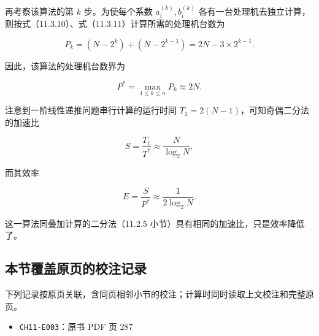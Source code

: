 \documentclass[
  10pt,
  fontset=fandol]{ctexart}
\providecommand{\tightlist}{%
  \setlength{\itemsep}{0pt}\setlength{\parskip}{0pt}}
\begin{document}
再考察该算法的第 \(k\) 步。为使每个系数 \(a_i^{(k)},b_i^{(k)}\) 各有一台处理机去独立计算，则按式（11.3.10）、式（11.3.11）计算所需的处理机台数为

\[
P_k=(N-2^k)+(N-2^{k-1})=2N-3\times2^{k-1}.
\]

因此，该算法的处理机台数界为

\[
P^*=\max_{1\le k\le n}P_k\approx2N.
\]

注意到一阶线性递推问题串行计算的运行时间 \(T_1=2(N-1)\)，可知奇偶二分法的加速比

\[
S=\frac{T_1}{T^*}\approx\frac{N}{\log_2 N},
\]

而其效率

\[
E=\frac{S}{P^*}\approx\frac{1}{2\log_2 N}.
\]

这一算法同叠加计算的二分法（11.2.5 小节）具有相同的加速比，只是效率降低了。

\subsection{本节覆盖原页的校注记录}\label{ux672cux8282ux8986ux76d6ux539fux9875ux7684ux6821ux6ce8ux8bb0ux5f55}

下列记录按原页关联，含同页相邻小节的校注；计算时同时读取上文校注和完整原页。

\begin{itemize}
\tightlist
\item
  \texttt{CH11-E003}：原书 PDF 页 287
\end{itemize}
\end{document}

